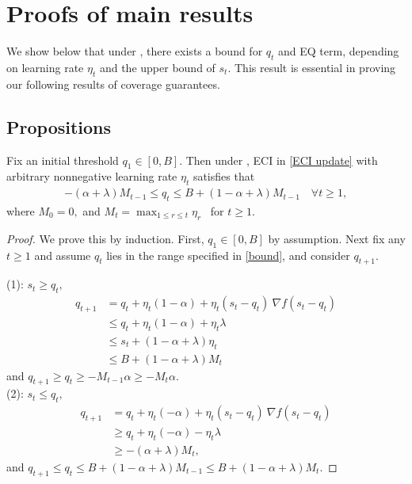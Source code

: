 \newpage
\section{Proofs of main results}
\label{proof}
We show below that under , there exists a bound for $q_t$ and EQ term, depending on learning rate $\eta_t$ and the upper bound of $s_t$. This result is essential in proving our following results of coverage guarantees.
\subsection{Propositions}
\begin{proposition}
\label{proposition1}
      Fix an initial threshold $q_1 \in [0, B]$. Then under ,  ECI in \eqref{ECI update} with arbitrary  nonnegative learning rate $\eta_t$ satisfies that
    \begin{align}
    \label{bound}
        -(\alpha+\lambda)M_{t-1} \leq q_t \leq B+(1-\alpha+\lambda)M_{t-1} \quad \forall t\geq 1,
    \end{align}
    where $M_0  = 0,$ and $M_t = \max_{1\leq r \leq t}\eta_r$ \ for $t\geq 1$.
\end{proposition}
\begin{proof}
We prove this by induction. First, $q_1\in[0,B]$ by assumption. Next fix any $t \geq 1$ and assume $q_t$  lies in the range specified in \eqref{bound}, and consider $q_{t+1}$.

(1): $s_t \geq q_t,$
\begin{align*}
    q_{t+1}&=q_t+\eta_t\left(1-\alpha\right)+\eta_t (s_t-q_t)\ \nabla f(s_t-q_t)\\ &\leq q_t+\eta_t\left(1-\alpha\right)+\eta_t \lambda\\
    & \leq s_t+(1-\alpha+\lambda)\eta_t\\
    & \leq B+(1-\alpha+\lambda)M_{t}
\end{align*}
and $q_{t+1} \geq q_t \geq -M_{t-1}\alpha  \geq -M_t\alpha $.
\\(2): $s_t \leq q_t,$
\begin{align*}
    q_{t+1}&=q_t+\eta_t\left(-\alpha\right)+\eta_t (s_t-q_t)\ \nabla f(s_t-q_t)\\ & \geq
    q_t+\eta_t\left(-\alpha\right)-\eta_t \lambda\\
    & \geq  -(\alpha+\lambda)M_{t},
\end{align*}
and $q_{t+1} \leq q_t \leq B+(1-\alpha+\lambda)M_{t-1} \leq B+(1-\alpha+\lambda)M_{t}.$
\end{proof}
